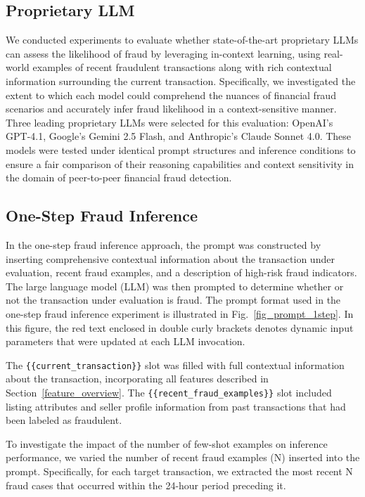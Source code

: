 \documentclass[sigconf]{acmart}
\begin{document}
\subsection{Proprietary LLM}\label{proprietary_llm}
We conducted experiments to evaluate whether state-of-the-art proprietary LLMs can assess the likelihood of fraud by leveraging in-context learning, using real-world examples of recent fraudulent transactions along with rich contextual information surrounding the current transaction. Specifically, we investigated the extent to which each model could comprehend the nuances of financial fraud scenarios and accurately infer fraud likelihood in a context-sensitive manner.
Three leading proprietary LLMs were selected for this evaluation: OpenAI's GPT-4.1, Google's Gemini 2.5 Flash, and Anthropic's Claude Sonnet 4.0. These models were tested under identical prompt structures and inference conditions to ensure a fair comparison of their reasoning capabilities and context sensitivity in the domain of peer-to-peer financial fraud detection.



\subsection{One-Step Fraud Inference}
In the one-step fraud inference approach, the prompt was constructed by inserting comprehensive contextual information about the transaction under evaluation, recent fraud examples, and a description of high-risk fraud indicators. The large language model (LLM) was then prompted to determine whether or not the transaction under evaluation is fraud. The prompt format used in the one-step fraud inference experiment is illustrated in Fig.~\ref{fig_prompt_1step}. In this figure, the red text enclosed in double curly brackets denotes dynamic input parameters that were updated at each LLM invocation.

The \texttt{\{\{current\_transaction\}\}} slot was filled with full contextual information about the transaction, incorporating all features described in Section~\ref{feature_overview}. The \texttt{\{\{recent\_fraud\_examples\}\}} slot included listing attributes and seller profile information from past transactions that had been labeled as fraudulent.

To investigate the impact of the number of few-shot examples on inference performance, we varied the number of recent fraud examples (N) inserted into the prompt. Specifically, for each target transaction, we extracted the most recent N fraud cases that occurred within the 24-hour period preceding it. 
\end{document}
